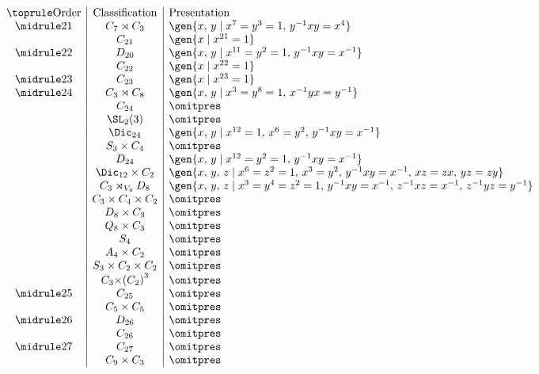\begin{displaymath}
\begin{array}{c|c|l}
\toprule
\text{Order} & \text{Classification} & \text{Presentation} \\
\midrule
21 & C_{7} \rtimes C_3 & \gen{x,\,y \mid x^7 = y^3 = 1,\, y^{-1}xy = x^4} \\
   & C_{21} & \gen{x \mid x^{21} = 1} \\
\midrule
22 & D_{20} & \gen{x,\,y \mid x^{11} = y^2 = 1,\, y^{-1}xy = x^{-1}} \\
   & C_{22} & \gen{x \mid x^{22} = 1} \\
\midrule
23 & C_{23} & \gen{x \mid x^{23} = 1} \\
\midrule
24 & C_3 \rtimes C_8 & \gen{x,\,y \mid x^3 = y^8 = 1,\, x^{-1}yx = y^{-1}} \\
   & C_{24} & {\omitpres} \\
   & \SL_2(3) & {\omitpres} \\
   & \Dic_{24} & \gen{x,\,y \mid x^{12} = 1,\, x^6 = y^2,\, y^{-1}xy = x^{-1}} \\
   & S_3 \times C_4 & {\omitpres} \\
   & D_{24} & \gen{x,\,y \mid x^{12} = y^2 = 1,\, y^{-1}xy = x^{-1}} \\
   & \Dic_{12} \times C_2 & \gen{x,\,y,\,z \mid x^6 = z^2 = 1,\, x^3 = y^2,\, y^{-1}xy = x^{-1},\, xz = zx,\, yz = zy} \\
   & C_3 \rtimes_{V_4} D_8 & \gen{x,\,y,\,z \mid x^3 = y^4 = z^2 = 1,\, y^{-1}xy = x^{-1},\, z^{-1}xz = x^{-1},\, z^{-1}yz = y^{-1}} \\
   & C_3 \times C_4 \times C_2 & {\omitpres} \\
   & D_8 \times C_3 & {\omitpres} \\
   & Q_8 \times C_3 & {\omitpres} \\
   & S_4 & {\omitpres} \\
   & A_4 \times C_2 & {\omitpres} \\
   & S_3 \times C_2 \times C_2 & {\omitpres} \\
   & C_3 {\times} {(C_2)}^3 & {\omitpres} \\
\midrule
25 & C_{25} & {\omitpres} \\
   & C_5 \times C_5 & {\omitpres} \\
\midrule
26 & D_{26} & {\omitpres} \\
   & C_{26} & {\omitpres} \\
\midrule
27 & C_{27} & {\omitpres} \\
   & C_9 \times C_3 & {\omitpres} \\

\end{array}
\end{displaymath}
